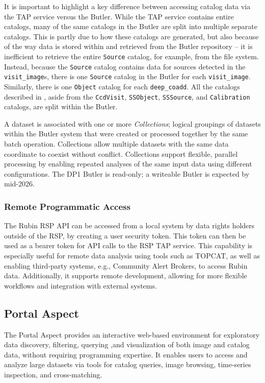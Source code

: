 It is important to highlight a key difference between accessing catalog data via the \gls{TAP} service versus the Butler.
While the \gls{TAP} service contains entire catalogs, many of the same catalogs in the Butler are split into multiple separate catalogs.
This is partly due to how these catalogs are generated, but also because of the way data is stored within and retrieved from the Butler repository -- it is inefficient to retrieve the entire \texttt{Source} catalog, for example, from the file system.
Instead, because the \texttt{Source} catalog contains data for sources detected in the \texttt{visit\_image}s, there is one \texttt{Source} catalog in the Butler for each \texttt{visit\_image}. Similarly, there is one \texttt{Object} catalog for each \texttt{deep\_coadd}.
All the catalogs described in , aside from the \texttt{CcdVisit}, \texttt{SSObject}, \texttt{SSSource}, and \texttt{Calibration} catalogs, are split within the Butler.


A dataset is associated with one or more \emph{Collections}; logical groupings of  datasets within the \gls{Butler} system that were created or processed together by the same batch operation.
Collections allow multiple datasets with the same data coordinate to coexist without conflict.
Collections support flexible, parallel processing by enabling repeated analyses of the same input data using different configurations.
The \gls{DP1} Butler is read-only; a writeable Butler is expected by mid-2026.

\subsubsection{Remote Programmatic Access}
\label{sssec:remote_api}
The Rubin \gls{RSP} \gls{API} can be accessed from a local system by data rights holders outside of the \gls{RSP}, by creating a user security token. This token can then be used as a bearer token for \gls{API} calls to the \gls{RSP} TAP service.
This capability is especially useful for remote data analysis using tools such as \gls{TOPCAT}, as well as enabling third-party systems, e.g., Community Alert Brokers, to access Rubin data.
Additionally, it supports remote development, allowing for more flexible workflows and integration with external systems.

\subsection{Portal Aspect}
\label{ssec:rsp_portal}
The Portal Aspect provides an interactive web-based environment for exploratory data discovery, filtering, querying ,and visualization of both image and catalog data, without requiring programming expertise.
It enables users to access and analyze large datasets via tools for catalog queries, image browsing, time-series inspection, and cross-matching.

